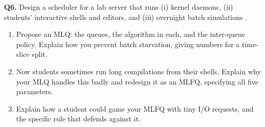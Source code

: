 \documentclass[11pt]{article}
\begin{document}
\textbf{Q6.} Design a scheduler for a lab server that runs (i) kernel daemons, (ii) students' interactive shells and editors, and (iii) overnight batch simulations \cite{SilberschatzOSC_operating_system_concepts}.
\begin{enumerate}
  \item[(a)] Propose an MLQ: the queues, the algorithm in each, and the inter-queue policy. Explain how you prevent batch starvation, giving numbers for a time-slice split.
  \item[(b)] Now students sometimes run long compilations from their shells. Explain why your MLQ handles this badly and redesign it as an MLFQ, specifying all five parameters.
  \item[(c)] Explain how a student could game your MLFQ with tiny I/O requests, and the specific rule that defends against it.
\end{enumerate}



\end{document}
